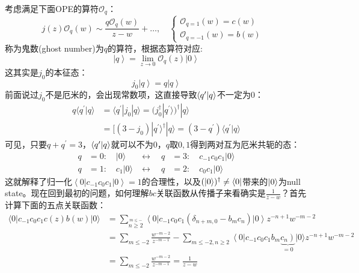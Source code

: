 考虑满足下面OPE的算符$\mathcal{O}_q$：
\begin{equation}
	j(z)\mathcal{O}_q(w)\sim\frac{q\mathcal{O}_q(w)}{z-w}+\ldots,\quad\begin{cases}\mathcal{O}_{q=1}(w)=c(w)\\\mathcal{O}_{q=-1}(w)=b(w)&\end{cases}
\end{equation}
称为鬼数(ghost number)为$q$的算符，根据态算符对应:
\begin{equation}
	\left|q\right\rangle=\lim_{{z}\to0}\mathcal{O}_q(z)\left|0\right\rangle 
\end{equation}
这其实是$j_0$的本征态：
\begin{equation}
	j_0\left|q\right\rangle=q\left|q\right\rangle 
\end{equation}
前面说过$j_0$不是厄米的，会出现常数项，这直接导致$\braket{q^\prime}{q}$不一定为0：
\begin{equation}
	\begin{aligned}q\langle q^{\prime}|q\rangle&=\langle q^{\prime}|j_0|q\rangle=(j_0^{\dagger}|q^{\prime}\rangle)^{\dagger}|q\rangle\\&=[(3-j_0)|q^{\prime}\rangle^{\dagger}|q\rangle=(3-q^{\prime})\langle q^{\prime}|q\rangle\end{aligned}
\end{equation}
可见，只要$q+q^\prime=3$，$\braket{q^\prime}{q}$就可以不为0，$q$取$0,1$得到两对互为厄米共轭的态：
\begin{equation}
	\begin{aligned}q&=0:\quad|0\rangle&\leftrightarrow \quad q&=3:\quad c_{-1}c_0c_1|0\rangle\\q&=1:\quad c_1|0\rangle&\leftrightarrow\quad q&=2:\quad c_0c_1|0\rangle\end{aligned}
\end{equation}
这就解释了归一化$\left\langle0\right|c_{-1}c_0c_1\left|0\right\rangle=1$的合理性，以及$(\ket{0})^\dagger\neq\bra{0}$带来的$\ket{0}$为null state。现在回到最初的问题，如何理解$bc$关联函数从传播子来看确实是$\frac1{z-w}$？首先计算下面的五点关联函数：
\begin{equation}
	\begin{aligned}
		\langle0|c_{-1}c_0c_1c(z)b(w)|0\rangle &=\sum_{\overset{m\leq-}{n\geq2}}\left\langle0\right|c_{-1}c_0c_1(\delta_{n+m,0}-b_mc_n)\left|0\right\rangle z^{-n+1}w^{-m-2}\\
		&=\sum_{m\leq-2}\left.\frac{w^{-m-2}}{z^{-m-1}}-\sum_{m\leq-2,n\geq2}\left<0\right|c_{-1}c_0c_1b_m\underbrace{\left.c_n\right)}_{=0}|0\rangle z^{-n+1}w^{-m-2}\right.  \\
		&=\sum_{m\leq-2}\frac{w^{-m-2}}{z^{-m-1}}=\frac1{z-w}
	\end{aligned}
\end{equation}
